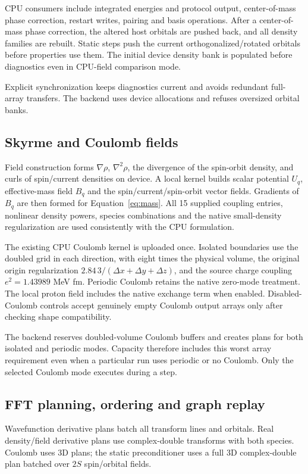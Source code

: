 \documentclass[11pt,a4paper]{article}
\begin{document}
CPU consumers include integrated energies and protocol output, center-of-mass
phase correction, restart writes, pairing and basis operations. After a
center-of-mass phase correction, the altered host orbitals are pushed back,
and all density families are rebuilt. Static steps push the current
orthogonalized/rotated orbitals before properties use them. The initial
device density bank is populated before diagnostics even in CPU-field
comparison mode.

Explicit synchronization keeps diagnostics current and avoids redundant
full-array transfers. The backend uses device allocations and refuses oversized orbital banks.

\subsection{Skyrme and Coulomb fields}
Field construction forms $\nabla\rho$, $\nabla^2\rho$, the divergence of the
spin-orbit density, and curls of spin/current densities on device. A local
kernel builds scalar potential $U_q$, effective-mass field $B_q$ and the
spin/current/spin-orbit vector fields. Gradients of $B_q$ are then formed for
Equation~\eqref{eq:mass}. All 15 supplied coupling entries, nonlinear density
powers, species combinations and the native small-density regularization are
used consistently with the CPU formulation.

The existing CPU Coulomb kernel is uploaded once. Isolated boundaries use
the doubled grid in each direction, with eight times the physical volume,
the original origin regularization $2.84\,3/(\Delta x+\Delta y+\Delta z)$,
and the source charge coupling $e^2=1.43989$ MeV fm. Periodic Coulomb retains
the native zero-mode treatment. The local proton field includes the native
exchange term when enabled. Disabled-Coulomb controls accept genuinely
empty Coulomb output arrays only after checking shape compatibility.

The backend reserves doubled-volume Coulomb buffers and creates plans for
both isolated and periodic modes. Capacity therefore includes this worst
array requirement even when a particular run uses periodic or no Coulomb.
Only the selected Coulomb mode executes during a step.

\subsection{FFT planning, ordering and graph replay}
Wavefunction derivative plans batch all transform lines and orbitals. Real
density/field derivative plans use complex-double transforms with both
species. Coulomb uses 3D plans; the static preconditioner uses a full 3D
complex-double plan batched over $2S$ spin/orbital fields.
\end{document}
